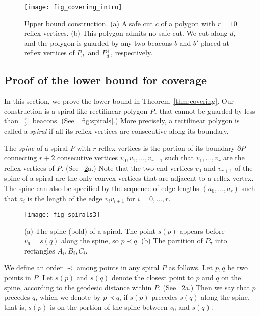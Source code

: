 \documentclass[11pt]{article}
\newcommand{\bd}{\ensuremath{\partial}}
\theoremstyle{definition}
\begin{document}
\begin{figure}[tb]
\centering
\texttt{[image: fig\_covering\_intro]}
\caption{Upper bound construction. 
(a) A safe cut $c$ of a polygon with $r=10$ reflex vertices.
(b) This polygon admits no safe cut. We cut along  $d$,
and the polygon is guarded by any two beacons $b$ and $b'$ placed at
reflex vertices of $P_d^-$ and $P_d^+$, respectively.
\label{fig:covering_intro}}
\end{figure}

\subsection{Proof of the lower bound for coverage}\label{subsec:lower_bound_coverage}


In this section, we prove the lower bound in Theorem~\ref{thm:covering}. Our construction is a 
spiral-like rectilinear polygon $P_r$ that cannot be guarded by less than  $\lceil \frac{r}{3} \rceil$
beacons. (See \figurename~\ref{fig:spirals}.) More precisely, a rectilinear polygon is called a \emph{spiral} if all its reflex vertices are consecutive along its boundary.

The \emph{spine} of a spiral $P$ with $r$ reflex vertices is
the portion of its boundary $\bd P$ connecting $r+2$ consecutive vertices $v_0, v_1, \ldots, v_{r+1}$
such that $v_1, \ldots, v_r$ are the reflex vertices of $P$. (See \figurename~\ref{fig:spirals3}a.)
Note that the two end vertices $v_0$ and $v_{r+1}$ of the spine of a spiral
are the only convex vertices that are adjacent to a reflex vertex.
The spine can also be specified by the sequence of edge lengths $(a_0, \ldots, a_r)$
such that $a_i$ is the length of the edge $v_iv_{i+1}$ for $i=0,\ldots, r$.

\begin{figure}[tb]
\centering
\texttt{[image: fig\_spirals3]}
\caption{(a) The spine (bold) of a spiral. The point $s(p)$ appears before
$v_6=s(q)$ along the spine, so $p \prec q$. (b) The partition of $P_7$ into rectangles $A_i,B_i,C_i$.
\label{fig:spirals3}}
\end{figure}

We define an order $\prec$ among points in any spiral $P$ as follows. Let $p,q$ be two points in $P$.
Let $s(p)$ and $s(q)$ denote the closest point to $p$ and $q$ on the spine, according to the geodesic
distance within $P$.  (See \figurename~\ref{fig:spirals3}a.) Then we say that $p$ precedes $q$, 
which we denote by $p \prec q$, if $s(p)$ precedes $s(q)$ along the spine, that is, $s(p)$ 
is on the portion of the spine between $v_0$ and $s(q)$.
\end{document}
